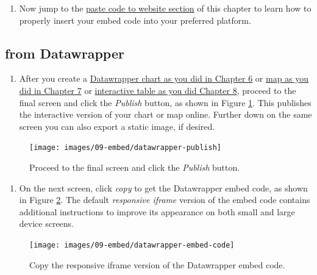 \documentclass[
  english,
]{book}
\providecommand{\tightlist}{%
  \setlength{\itemsep}{0pt}\setlength{\parskip}{0pt}}
\begin{document}
\begin{enumerate}
\def\labelenumi{\arabic{enumi}.}
\setcounter{enumi}{3}
\tightlist
\item
  Now jump to the \href{paste-code.html}{paste code to website section} of this chapter to learn how to properly insert your embed code into your preferred platform.
\end{enumerate}

\hypertarget{from-datawrapper}{%
\subsection*{from Datawrapper}\label{from-datawrapper}}

\begin{enumerate}
\def\labelenumi{\arabic{enumi}.}
\tightlist
\item
  After you create a \href{chart-datawrapper.html}{Datawrapper chart as you did in Chapter 6} or \href{map.html}{map as you did in Chapter 7} or \href{table.html}{interactive table as you did Chapter 8}, proceed to the final screen and click the \emph{Publish} button, as shown in Figure \ref{fig:datawrapper-publish}. This publishes the interactive version of your chart or map online. Further down on the same screen you can also export a static image, if desired.
\end{enumerate}



\begin{figure}
\texttt{[image: images/09-embed/datawrapper-publish]} \caption{Proceed to the final screen and click the \emph{Publish} button.}\label{fig:datawrapper-publish}
\end{figure}

\begin{enumerate}
\def\labelenumi{\arabic{enumi}.}
\setcounter{enumi}{1}
\tightlist
\item
  On the next screen, click \emph{copy} to get the Datawrapper embed code, as shown in Figure \ref{fig:datawrapper-embed-code}. The default \emph{responsive iframe} version of the embed code contains additional instructions to improve its appearance on both small and large device screens.
\end{enumerate}



\begin{figure}
\texttt{[image: images/09-embed/datawrapper-embed-code]} \caption{Copy the responsive iframe version of the Datawrapper embed code.}\label{fig:datawrapper-embed-code}
\end{figure}
\end{document}
